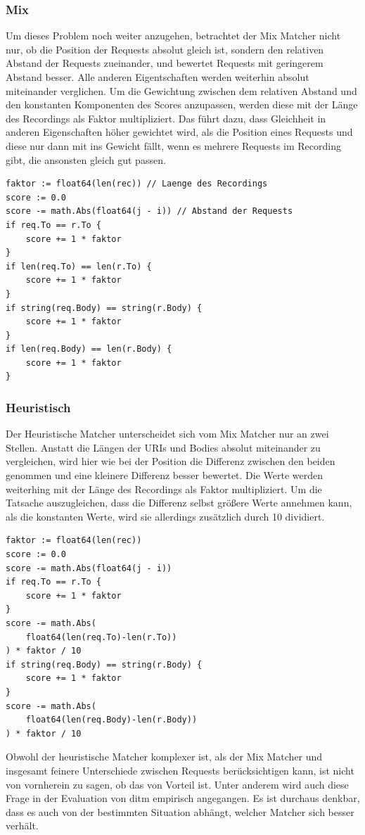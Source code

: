 \documentclass[12pt,a4paper]{report}
\begin{document}
\subsubsection{Mix}
Um dieses Problem noch weiter anzugehen, betrachtet der Mix Matcher nicht nur, ob die Position der Requests absolut gleich
ist, sondern den relativen Abstand der Requests zueinander, und bewertet Requests mit geringerem Abstand besser. Alle
anderen Eigentschaften werden weiterhin absolut miteinander verglichen. Um die Gewichtung zwischen dem relativen Abstand
und den konstanten Komponenten des Scores anzupassen, werden diese mit der Länge des Recordings als Faktor multipliziert.
Das führt dazu, dass Gleichheit in anderen Eigenschaften höher gewichtet wird, als die Position eines Requests und diese
nur dann mit ins Gewicht fällt, wenn es mehrere Requests im Recording gibt, die ansonsten gleich gut passen.
\begin{lstlisting}
faktor := float64(len(rec)) // Laenge des Recordings
score := 0.0
score -= math.Abs(float64(j - i)) // Abstand der Requests
if req.To == r.To {
    score += 1 * faktor
}
if len(req.To) == len(r.To) {
    score += 1 * faktor
}
if string(req.Body) == string(r.Body) {
    score += 1 * faktor
}
if len(req.Body) == len(r.Body) {
    score += 1 * faktor
}
\end{lstlisting}

\subsubsection{Heuristisch}
Der Heuristische Matcher unterscheidet sich vom Mix Matcher nur an zwei Stellen. Anstatt die Längen der URIs und Bodies
absolut miteinander zu vergleichen, wird hier wie bei der Position die Differenz zwischen den beiden genommen und eine kleinere
Differenz besser bewertet. Die Werte werden weiterhing mit der Länge des Recordings als Faktor multipliziert. Um die Tatsache
auszugleichen, dass die Differenz selbst größere Werte annehmen kann, als die konstanten Werte, wird sie allerdings zusätzlich
durch 10 dividiert.
\begin{lstlisting}
faktor := float64(len(rec))
score := 0.0
score -= math.Abs(float64(j - i))
if req.To == r.To {
    score += 1 * faktor
}
score -= math.Abs(
    float64(len(req.To)-len(r.To))
) * faktor / 10
if string(req.Body) == string(r.Body) {
    score += 1 * faktor
}
score -= math.Abs(
    float64(len(req.Body)-len(r.Body))
) * faktor / 10
\end{lstlisting}
Obwohl der heuristische Matcher komplexer ist, als der Mix Matcher und insgesamt feinere Unterschiede zwischen Requests
berücksichtigen kann, ist nicht von vornherein zu sagen, ob das von Vorteil ist. Unter anderem wird auch diese Frage in
der Evaluation von ditm empirisch angegangen. Es ist durchaus denkbar, dass es auch von der bestimmten Situation abhängt,
welcher Matcher sich besser verhält.
\end{document}
